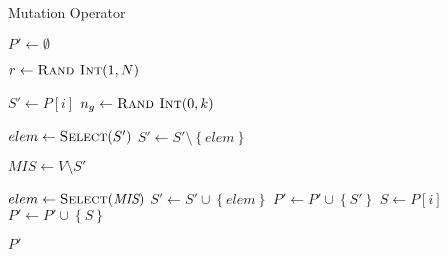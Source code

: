 \begin{algorithm}
  \caption{Mutation Operator}\label{alg:GENETIKUS_ALGORITMUS:MUTACIO}
  \begin{algorithmic}[1]
    \State $P' \leftarrow \emptyset$

    \State $r \leftarrow \Call{Rand Int}{1, N}$

    \State $S' \leftarrow P[i]$
    \State $n_{g} \leftarrow \Call{Rand Int}{0, k}$

    \State $elem \leftarrow \Call{Select}{S'}$
    \State $S' \leftarrow S' \setminus \left\{ elem \right\}$
    \EndFor

    \State $\textit{MIS} \leftarrow V \setminus S'$

    \State $elem \leftarrow \Call{Select}{\textit{MIS}}$
    \State $S' \leftarrow S' \cup \left\{ elem \right\}$
    \EndWhile
    \State $P' \leftarrow P' \cup \left\{ S' \right\}$
    \Else
    \State $S \leftarrow P\left[ i \right]$
    \State $P' \leftarrow P' \cup \left\{ S \right\}$
    \EndIf
    \EndFor

    \State \Return $P'$
    \EndFunction
  \end{algorithmic}
\end{algorithm}
